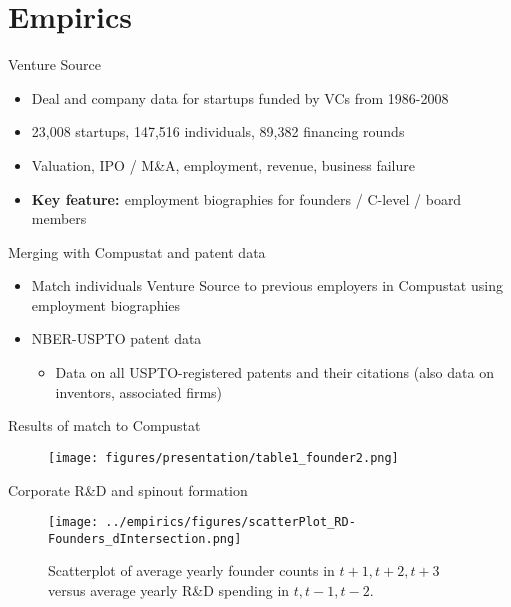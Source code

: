 \documentclass[english,usenames,dvipsnames]{beamer}
\begin{document}
\section{Empirics}

\begin{frame}
\tableofcontents[currentsection]
\end{frame}

\begin{frame}{Venture Source}
\begin{itemize}
	\item Deal and company data for startups funded by VCs from 1986-2008
	\item 23,008 startups, 147,516 individuals, 89,382 financing rounds
	\item Valuation, IPO / M\&A, employment, revenue, business failure
	\item \textbf{\alert{Key feature: }} employment biographies for founders / C-level / board members
\end{itemize}
\end{frame}

\begin{frame}{Merging with Compustat and patent data}
\begin{itemize}
\item Match individuals Venture Source to previous employers in Compustat using employment biographies
\item NBER-USPTO patent data
\begin{itemize}
	\item Data on all USPTO-registered patents and their citations (also data on inventors, associated firms)
\end{itemize}
\end{itemize}
\end{frame}

\begin{frame}{Results of match to Compustat}
\begin{figure}
	\texttt{[image: figures/presentation/table1\_founder2.png]}
\end{figure}
\end{frame}

\begin{frame}{Corporate R\&D and spinout formation}
\begin{figure}[!htb]
	\centering
	\texttt{[image: ../empirics/figures/scatterPlot\_RD-Founders\_dIntersection.png]}
	\caption{Scatterplot of average yearly founder counts in $t+1,t+2,t+3$ versus average yearly R\&D spending in $t,t-1,t-2$.}
\end{figure}
\end{frame}
\end{document}
